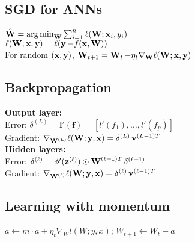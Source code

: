 \subsection*{SGD for ANNs}
$\hat{\W}=\argmin_{\W}\sum_{i=1}^n\ell(\W;\x_i,y_i)$ \\
$\ell(\W;\x,\y)=\ell(\y-f(\x,\W))$ \\
For random $(\x,\y)$, $\W_{t+1}=\W_t-\eta_t\nabla_{\W}\ell(\W;\x,\y)$

\subsection*{Backpropagation}
\textbf{Output layer:}\\
Error: $\delta^{(L)}=\mathbf{l}'(\mathbf{f})=[l'(f_1),\ldots,l'(f_p)]$\\
Gradient: $\nabla_{\W^{(L)}}\ell(\W;\y,\x)=\delta^{(L)}\vv^{(L-1)T}$\\
\textbf{Hidden layers:}\\
Error: $\delta^{(\ell)}=\phi'(\z^{(\ell)})\odot\W^{(\ell+1)T}\delta^{(\ell+1)}$\\
Gradient: $\nabla_{\W^{(\ell)}}\ell(\W;\y,\x)=\delta^{(\ell)}\vv^{(\ell-1)T}$

\subsection*{Learning with momentum}
$a \leftarrow m \cdot a + \eta_t \nabla_W l(W;y,x)$; $W_{t+1} \leftarrow W_t - a$
